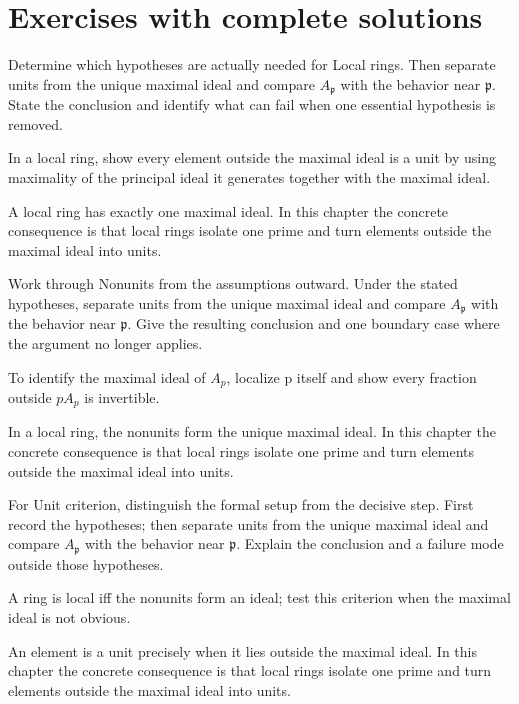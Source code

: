 \section{Exercises with complete solutions}

\begin{exercise}\label{exr:v08-01}
Determine which hypotheses are actually needed for Local rings. Then separate units from the unique maximal ideal and compare \(A_{\mathfrak p}\) with the behavior near \(\mathfrak p\). State the conclusion and identify what can fail when one essential hypothesis is removed.
\end{exercise}
\begin{hint}
In a local ring, show every element outside the maximal ideal is a unit by using maximality of the principal ideal it generates together with the maximal ideal.
\end{hint}
\begin{solution}
A local ring has exactly one maximal ideal. In this chapter the concrete consequence is that local rings isolate one prime and turn elements outside the maximal ideal into units.
\end{solution}

\begin{exercise}\label{exr:v08-02}
Work through Nonunits from the assumptions outward. Under the stated hypotheses, separate units from the unique maximal ideal and compare \(A_{\mathfrak p}\) with the behavior near \(\mathfrak p\). Give the resulting conclusion and one boundary case where the argument no longer applies.
\end{exercise}
\begin{hint}
To identify the maximal ideal of \(A_p\), localize p itself and show every fraction outside \(pA_p\) is invertible.
\end{hint}
\begin{solution}
In a local ring, the nonunits form the unique maximal ideal. In this chapter the concrete consequence is that local rings isolate one prime and turn elements outside the maximal ideal into units.
\end{solution}

\begin{exercise}\label{exr:v08-03}
For Unit criterion, distinguish the formal setup from the decisive step. First record the hypotheses; then separate units from the unique maximal ideal and compare \(A_{\mathfrak p}\) with the behavior near \(\mathfrak p\). Explain the conclusion and a failure mode outside those hypotheses.
\end{exercise}
\begin{hint}
A ring is local iff the nonunits form an ideal; test this criterion when the maximal ideal is not obvious.
\end{hint}
\begin{solution}
An element is a unit precisely when it lies outside the maximal ideal. In this chapter the concrete consequence is that local rings isolate one prime and turn elements outside the maximal ideal into units.
\end{solution}

